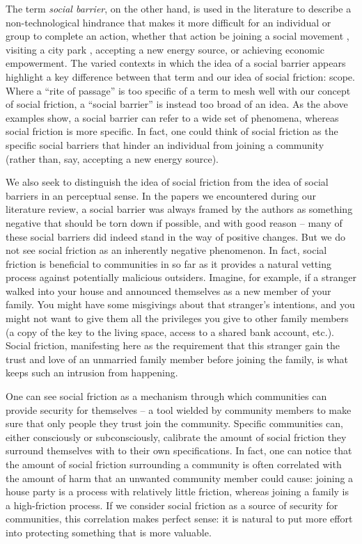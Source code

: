 \documentclass[sigconf,authordraft]{acmart}
\begin{document}
The term {\itshape social barrier}, on the other hand, is used in the literature to describe a non-technological hindrance that makes it more difficult for an individual or group to complete an action, whether that action be joining a social movement \cite{klandermans1987potentials}, visiting a city park \cite{cutts2009city}, accepting a new energy source\cite{pasqualetti2011social}, or achieving economic empowerment\cite{woolcock2000removing}. The varied contexts in which the idea of a social barrier appears highlight a key difference between that term and our idea of social friction: scope. Where a ``rite of passage'' is too specific of a term to mesh well with our concept of social friction, a ``social barrier'' is instead too broad of an idea. As the above examples show, a social barrier can refer to a wide set of phenomena, whereas social friction is more specific. In fact, one could think of social friction as the specific social barriers that hinder an individual from joining a community (rather than, say, accepting a new energy source). 

We also seek to distinguish the idea of social friction from the idea of social barriers in an perceptual sense. In the papers we encountered during our literature review, a social barrier was always framed by the authors as something negative that should be torn down if possible, and with good reason -- many of these social barriers did indeed stand in the way of positive changes. But we do not see social friction as an inherently negative phenomenon. In fact, social friction is beneficial to communities in so far as it provides a natural vetting process against potentially malicious outsiders. Imagine, for example, if a stranger walked into your house and announced themselves as a new member of your family. You might have some misgivings about that stranger's intentions, and you might not want to give them all the privileges you give to other family members (a copy of the key to the living space, access to a shared bank account, etc.). Social friction, manifesting here as the requirement that this stranger gain the trust and love of an unmarried family member before joining the family, is what keeps such an intrusion from happening. 


One can see social friction as a mechanism through which communities can provide security for themselves -- a tool wielded by community members to make sure that only people they trust join the community. Specific communities can, either consciously or subconsciously, calibrate the amount of social friction they surround themselves with to their own specifications. In fact, one can notice that the amount of social friction surrounding a community is often correlated with the amount of harm that an unwanted community member could cause: joining a house party is a process with relatively little friction, whereas joining a family is a high-friction process. If we consider social friction as a source of security for communities, this correlation makes perfect sense: it is natural to put more effort into protecting something that is more valuable.
\end{document}
